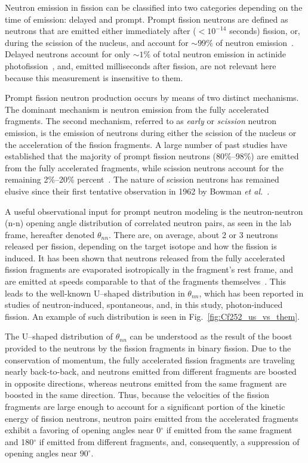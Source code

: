 \documentclass[%
 reprint,
 amsmath,amssymb,
 aps,
 nofootinbib
]{revtex4-1}
\begin{document}
Neutron emission in fission can be classified into two categories depending on the time of emission: delayed and prompt.
Prompt fission neutrons are defined as neutrons that are emitted either immediately after ($<10^{-14}$ seconds) fission, or, during the scission of the nucleus, and account for $\sim99\%$ of neutron emission~\cite{Caldwell2017DelayedNs}.
Delayed neutrons account for only $\sim1\%$ of total neutron emission in actinide photofission~\cite{Caldwell2017DelayedNs}, and, emitted milliseconds after fission, are not relevant here because this measurement is insensitive to them.

Prompt fission neutron production occurs by means of two distinct mechanisms.
The dominant mechanism is neutron emission from the fully accelerated fragments.
The second mechanism, referred to as \textit{early} or \textit{scission} neutron emission, is the emission of neutrons during either the scission of the nucleus or the acceleration of the fission fragments.
A large number of past studies have established that the majority of prompt fission neutrons (80\%--98\%) are emitted from the fully accelerated fragments, while scission neutrons account for the remaining 2\%--20\% percent~\cite{Scission2005}.
The nature of scission neutrons has remained elusive since their first tentative observation in 1962 by Bowman \emph{et al.}~\cite{Bowman}.

A useful observational input for prompt neutron modeling is the neutron-neutron (n-n) opening angle distribution of correlated neutron pairs, as seen in the lab frame, hereafter denoted $\theta_{nn}$.
There are, on average, about 2 or 3 neutrons released per fission, depending on the target isotope and how the fission is induced.
It has been shown that neutrons released from the fully accelerated fission fragments are evaporated isotropically in the fragment's rest frame, and are emitted at speeds comparable to that of the fragments themselves~\cite{JORGENSEN}.
This leads to the well-known U--shaped distribution in $\theta_{nn}$, which has been reported in studies of neutron-induced, spontaneous, and, in this study, photon-induced fission.
An example of such distribution is seen in Fig.~\ref{fig:Cf252_us_vs_them}.

The U--shaped distribution of $\theta_{nn}$ can be understood as the result of the boost provided to the neutrons by the fission fragments in binary fission.
Due to the conservation of momentum, the fully accelerated fission fragments are traveling nearly back-to-back, and neutrons emitted from different fragments are boosted in opposite directions, whereas neutrons emitted from the same fragment are boosted in the same direction.
Thus, because the velocities of the fission fragments are large enough to account for a significant portion of the kinetic energy of fission neutrons, neutron pairs emitted from the accelerated fragments exhibit a favoring of opening angles near 0$^{\circ}$ if emitted from the same fragment and 180$^{\circ}$ if emitted from different fragments, and, consequently, a suppression of opening angles near $90^{\circ}$.
\end{document}
